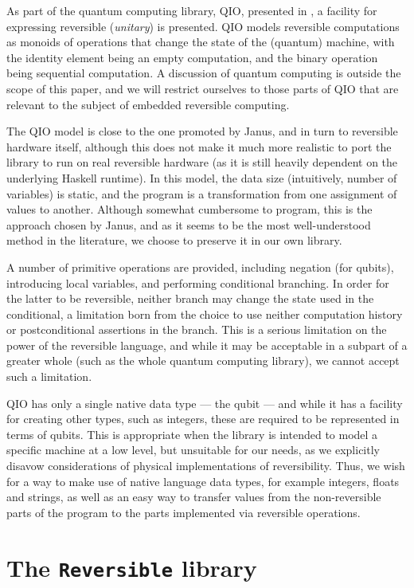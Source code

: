 \documentclass[10pt]{sigplanconf}
\begin{document}
As part of the quantum computing library, QIO, presented in
\cite{altenkirchquantum}, a facility for expressing reversible
(\textit{unitary}) is presented.  QIO models reversible computations
as monoids of operations that change the state of the (quantum)
machine, with the identity element being an empty computation, and the
binary operation being sequential computation.  A discussion of
quantum computing is outside the scope of this paper, and we will
restrict ourselves to those parts of QIO that are relevant to the
subject of embedded reversible computing.

The QIO model is close to the one promoted by Janus, and in turn to
reversible hardware itself, although this does not make it much more
realistic to port the library to run on real reversible hardware (as
it is still heavily dependent on the underlying Haskell runtime).  In
this model, the data size (intuitively, number of variables) is
static, and the program is a transformation from one assignment of
values to another.  Although somewhat cumbersome to program, this is
the approach chosen by Janus, and as it seems to be the most
well-understood method in the literature, we choose to preserve it in
our own library.

A number of primitive operations are provided, including negation (for
qubits), introducing local variables, and performing conditional
branching.  In order for the latter to be reversible, neither branch
may change the state used in the conditional, a limitation born from
the choice to use neither computation history or postconditional
assertions in the branch.  This is a serious limitation on the power
of the reversible language, and while it may be acceptable in a
subpart of a greater whole (such as the whole quantum computing
library), we cannot accept such a limitation.

QIO has only a single native data type --- the qubit --- and while it
has a facility for creating other types, such as integers, these are
required to be represented in terms of qubits.  This is appropriate
when the library is intended to model a specific machine at a low
level, but unsuitable for our needs, as we explicitly disavow
considerations of physical implementations of reversibility.  Thus, we
wish for a way to make use of native language data types, for example
integers, floats and strings, as well as an easy way to transfer
values from the non-reversible parts of the program to the parts
implemented via reversible operations.

\section{The \texttt{Reversible} library}
\end{document}
